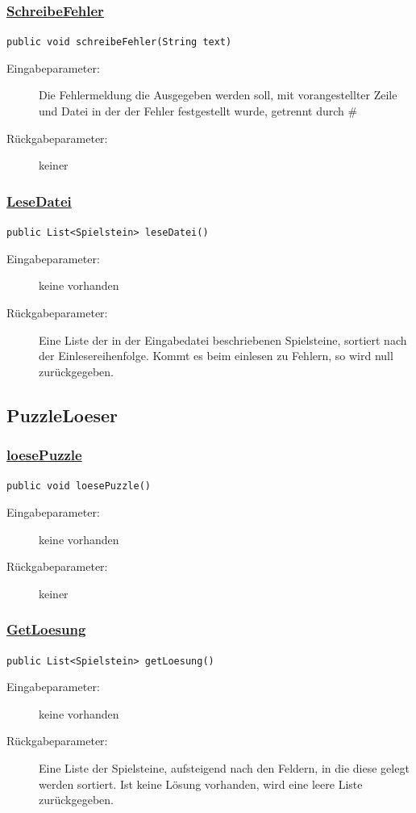 \subsubsection{\underline{SchreibeFehler}}
\lstinline{public void schreibeFehler(String text)}
\begin{description}
	\item [Eingabeparameter:] Die Fehlermeldung die Ausgegeben werden soll, mit vorangestellter Zeile und Datei in der der Fehler festgestellt wurde, getrennt durch \#
	\item [Rückgabeparameter:] keiner
\end{description}

\subsubsection{\underline{LeseDatei}}
\lstinline{public List<Spielstein> leseDatei()}
\begin{description}
    \item [Eingabeparameter:] keine vorhanden
    \item [Rückgabeparameter:] Eine Liste der in der Eingabedatei beschriebenen Spielsteine, sortiert nach der Einlesereihenfolge. Kommt es beim einlesen zu Fehlern, so wird null zurückgegeben.
\end{description}

\subsection{PuzzleLoeser}
\subsubsection{\underline{loesePuzzle}}
\lstinline{public void loesePuzzle()}
\begin{description}
	\item [Eingabeparameter:] keine vorhanden
	\item [Rückgabeparameter:] keiner
\end{description}

\subsubsection{\underline{GetLoesung}}
\lstinline{public List<Spielstein> getLoesung()}
\begin{description}
	\item [Eingabeparameter:] keine vorhanden
	\item [Rückgabeparameter:] Eine Liste der Spielsteine, aufsteigend nach den Feldern, in die diese gelegt werden sortiert. Ist keine Lösung vorhanden, wird eine leere Liste zurückgegeben.
\end{description}

